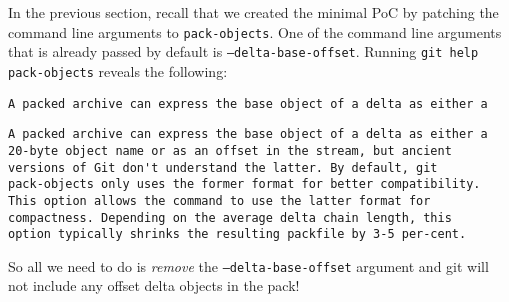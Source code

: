\documentclass{article}
\begin{document}
In the previous section, recall that we created the minimal PoC by
patching the command line arguments to \texttt{pack-objects}.  One of
the command line arguments that is already passed by default
is \texttt{--delta-base-offset}. Running \texttt{git help
pack-objects} reveals the following:
\begin{center}
{\footnotesize{}\hbox{\verb|A packed archive can express the base object of a delta as either a|}
\begin{minipage}{\wd9}
\begin{verbatim}
A packed archive can express the base object of a delta as either a
20-byte object name or as an offset in the stream, but ancient
versions of Git don't understand the latter. By default, git
pack-objects only uses the former format for better compatibility.
This option allows the command to use the latter format for
compactness. Depending on the average delta chain length, this
option typically shrinks the resulting packfile by 3-5 per-cent.
\end{verbatim}
\end{minipage}}
\end{center}
So all we need to do is \emph{remove} the \texttt{--delta-base-offset}
argument and git will not include any offset delta objects in the
pack!
\end{document}
